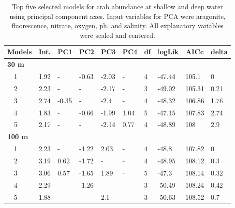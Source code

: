 \documentclass[letterpaper,12pt]{article}\usepackage[]{graphicx}\usepackage[]{color}
\begin{document}
\begin{landscape}
\centering\vspace*{\fill}
\begin{table}[!tbp]
{\scriptsize
\caption{Top five selected models for crab abundance at shallow and deep water using principal component axes. Input variables for PCA were aragonite, fluorescence, nitrate, oxygen, ph, and salinity. All explanatory variables were scaled and centered.\label{tab:abutabpca}} 
\begin{center}
\begin{tabular}{llllllllll}
\hline\hline
\multicolumn{1}{l}{Models}&\multicolumn{1}{c}{Int.}&\multicolumn{1}{c}{PC1}&\multicolumn{1}{c}{PC2}&\multicolumn{1}{c}{PC3}&\multicolumn{1}{c}{PC4}&\multicolumn{1}{c}{df}&\multicolumn{1}{c}{logLik}&\multicolumn{1}{c}{AICc}&\multicolumn{1}{c}{delta}\tabularnewline
\hline
{\bfseries 30 m}&&&&&&&&&\tabularnewline
~~1&1.92&-&-0.63&-2.03&-&4&-47.44&105.1&0\tabularnewline
~~2&2.23&-&-&-2.17&-&3&-49.02&105.31&0.21\tabularnewline
~~3&2.74&-0.35&-&-2.4&-&4&-48.32&106.86&1.76\tabularnewline
~~4&1.83&-&-0.66&-1.99&1.04&5&-47.15&107.83&2.74\tabularnewline
~~5&2.17&-&-&-2.14&0.77&4&-48.89&108&2.9\tabularnewline
\hline
{\bfseries 100 m}&&&&&&&&&\tabularnewline
~~1&2.23&-&-1.22&2.03&-&4&-48.8&107.82&0\tabularnewline
~~2&3.19&0.62&-1.72&-&-&4&-48.95&108.12&0.3\tabularnewline
~~3&3.06&0.57&-1.65&1.89&-&5&-47.3&108.14&0.32\tabularnewline
~~4&2.29&-&-1.26&-&-&3&-50.49&108.24&0.42\tabularnewline
~~5&1.88&-&-&2.1&-&3&-50.63&108.52&0.7\tabularnewline
\hline
\end{tabular}\end{center}}
\end{table}

\end{landscape}
\end{document}
